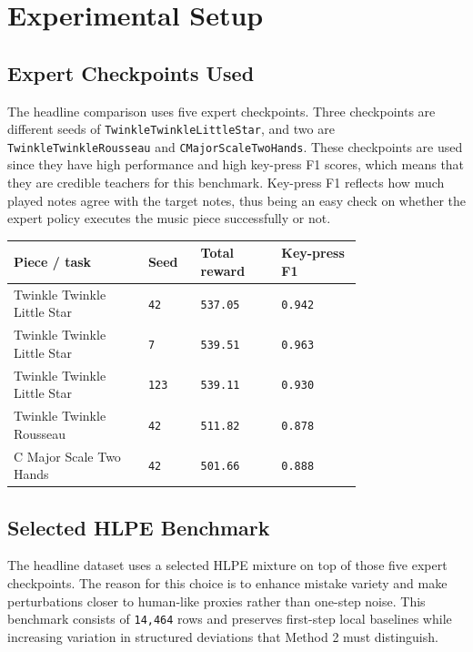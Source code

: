 \documentclass[11pt]{article}
\begin{document}
\section{Experimental Setup}

\subsection*{Expert Checkpoints Used}

The headline comparison uses five expert checkpoints. Three checkpoints are different seeds of \texttt{TwinkleTwinkleLittleStar}, and two are \texttt{TwinkleTwinkleRousseau} and \texttt{CMajorScaleTwoHands}. These checkpoints are used since they have high performance and high key-press F1 scores, which means that they are credible teachers for this benchmark. Key-press F1 reflects how much played notes agree with the target notes, thus being an easy check on whether the expert policy executes the music piece successfully or not.

\begin{table}[h]
\centering
\small
\begin{tabular}{>{\raggedright\arraybackslash}p{0.30\linewidth}>{\raggedright\arraybackslash}p{0.10\linewidth}>{\raggedright\arraybackslash}p{0.18\linewidth}>{\raggedright\arraybackslash}p{0.18\linewidth}}
\toprule
Piece / task & Seed & Total reward & Key-press F1 \\
\midrule
Twinkle Twinkle Little Star & \texttt{42} & \texttt{537.05} & \texttt{0.942} \\
Twinkle Twinkle Little Star & \texttt{7} & \texttt{539.51} & \texttt{0.963} \\
Twinkle Twinkle Little Star & \texttt{123} & \texttt{539.11} & \texttt{0.930} \\
Twinkle Twinkle Rousseau & \texttt{42} & \texttt{511.82} & \texttt{0.878} \\
C Major Scale Two Hands & \texttt{42} & \texttt{501.66} & \texttt{0.888} \\
\bottomrule
\end{tabular}
\end{table}

\subsection*{Selected HLPE Benchmark}

The headline dataset uses a selected HLPE mixture on top of those five expert checkpoints. The reason for this choice is to enhance mistake variety and make perturbations closer to human-like proxies rather than one-step noise. This benchmark consists of \texttt{14,464} rows and preserves first-step local baselines while increasing variation in structured deviations that Method 2 must distinguish.
\end{document}
